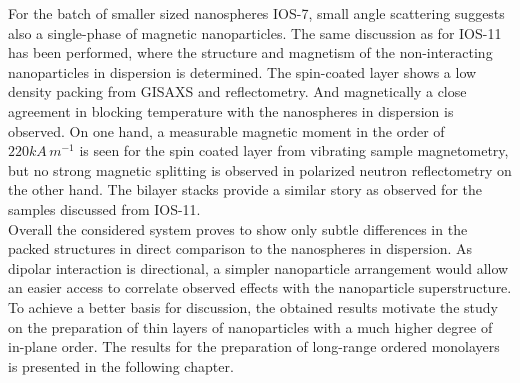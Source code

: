 \documentclass[\main/dresen_thesis.tex]{subfiles}
\begin{document}
  For the batch of smaller sized nanospheres IOS-7, small angle scattering suggests also a single-phase of magnetic nanoparticles.
  The same discussion as for IOS-11 has been performed, where the structure and magnetism of the non-interacting nanoparticles in dispersion is determined.
  The spin-coated layer shows a low density packing from GISAXS and reflectometry.
  And magnetically a close agreement in blocking temperature with the nanospheres in dispersion is observed.
  On one hand, a measurable magnetic moment in the order of $220 \unit{kA \, m^{-1}}$ is seen for the spin coated layer from vibrating sample magnetometry, but no strong magnetic splitting is observed in polarized neutron reflectometry on the other hand.
  The bilayer stacks provide a similar story as observed for the samples discussed from IOS-11.
  \\

  Overall the considered system proves to show only subtle differences in the packed structures in direct comparison to the nanospheres in dispersion.
  As dipolar interaction is directional, a simpler nanoparticle arrangement would allow an easier access to correlate observed effects with the nanoparticle superstructure.
  To achieve a better basis for discussion, the obtained results motivate the study on the preparation of thin layers of nanoparticles with a much higher degree of in-plane order.
  The results for the preparation of long-range ordered monolayers is presented in the following chapter.
\end{document}
